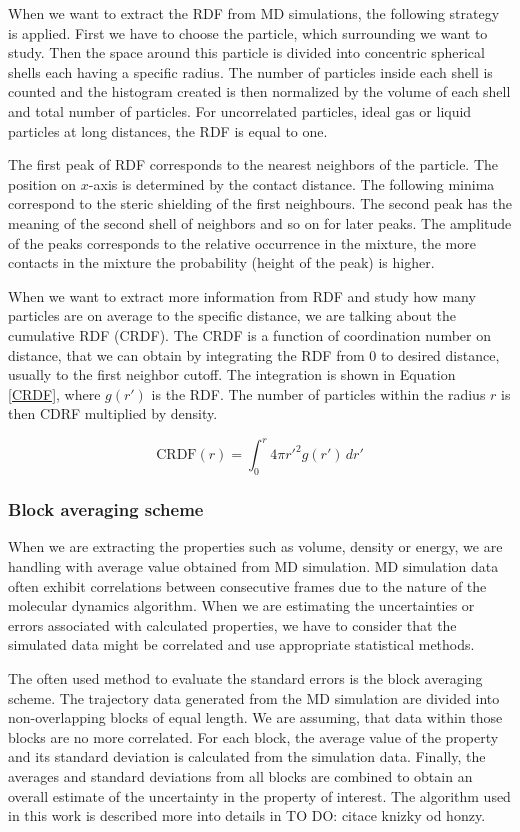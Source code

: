 When we want to extract the RDF from MD simulations, the following strategy is applied. First we have to choose the particle, which surrounding we want to study. Then the space around this particle is divided into concentric spherical shells each having a specific radius. The number of particles inside each shell is counted and the histogram created is then normalized by the volume of each shell and total number of particles. For uncorrelated particles, ideal gas or liquid particles at long distances, the RDF is equal to one. 

The first peak of RDF corresponds to the nearest neighbors of the particle. The position on $x$-axis is determined by the contact distance. The following minima correspond to the steric shielding of the first neighbours. The second peak has the meaning of the second shell of neighbors and so on for later peaks. The amplitude of the peaks corresponds to the relative occurrence in the mixture, the more contacts in the mixture the probability (height of the peak) is higher.

When we want to extract more information from RDF and study how many particles are on average to the specific distance, we are talking about the cumulative RDF (CRDF). The CRDF is a function of coordination number on distance, that we can obtain by integrating the RDF from 0 to desired distance, usually to the first neighbor cutoff. The integration is shown in Equation \ref{CRDF}, where $g(r')$ is the RDF. The number of particles within the radius $r$ is then CDRF multiplied by density.

\begin{equation}\label{eq:CRDF}
	\text{CRDF}(r) = \int_{0}^{r} 4\pi r'^2 g(r') \, dr'
\end{equation}

\subsubsection{Block averaging scheme}
When we are extracting the properties such as volume, density or energy, we are handling with average value obtained from MD simulation. MD simulation data often exhibit correlations between consecutive frames due to the nature of the molecular dynamics algorithm. When we are estimating the uncertainties or errors associated with calculated properties, we have to consider that the simulated data might be correlated and use appropriate statistical methods. 

The often used method to evaluate the standard errors is the block averaging scheme. The trajectory data generated from the MD simulation are divided into non-overlapping blocks of equal length. We are assuming, that data within those blocks are no more correlated. For each block, the average value of the property and its standard deviation is calculated from the simulation data. Finally, the averages and standard deviations from all blocks are combined to obtain an overall estimate of the uncertainty in the property of interest. The algorithm used in this work is described more into details in TO DO: citace knizky od honzy\cite{}.


